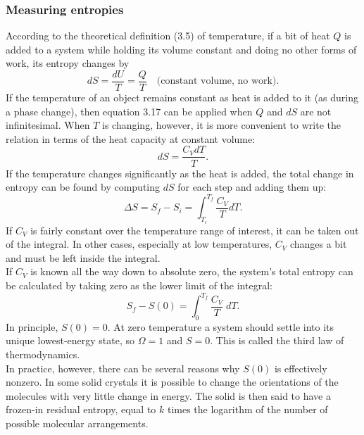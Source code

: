 \documentclass[11pt]{exam}
\begin{document}
\subsubsection*{Measuring entropies}
According to the theoretical definition (3.5) of temperature, if a bit of heat $Q$ is added to a system while holding its volume constant and doing no other forms of work, its entropy changes by
\begin{equation}\tag{3.17}
dS=\frac{dU}{T}=\frac{Q}{T}\quad\text{(constant volume, no work).}
\end{equation}
\hspace*{10mm}If the temperature of an object remains constant as heat is added to it (as during a phase change), then equation 3.17 can be applied when $Q$ and $dS$ are not infinitesimal. When $T$ is changing, however, it is more convenient to write the relation in terms of the heat capacity at constant volume:
\begin{equation}\tag{3.18}
dS=\frac{C_V dT}{T}.
\end{equation}
If the temperature changes significantly as the heat is added, the total change in entropy can be found by computing $dS$ for each step and adding them up:
\begin{equation}\tag{3.19}
\Delta S = S_f - S_i = \int_{T_i}^{T_f}\frac{C_V}{T}dT.     
\end{equation}
If $C_V$ is fairly constant over the temperature range of interest, it can be taken out of the integral. In other cases, especially at low temperatures, $C_V$ changes a bit and must be left inside the integral.\\
\hspace*{10mm}If $C_V$ is known all the way down to absolute zero, the system's total entropy can be calculated by taking zero as the lower limit of the integral:
\begin{equation}
S_f - S(0) = \int_{0}^{T_f}\frac{C_V}{T}\;dT.   
\end{equation}
In principle, $S(0)=0$. At zero temperature a system should settle into its unique lowest-energy state, so $\Omega=1$ and $S=0$. This is called the third law of thermodynamics.\\
\hspace*{10mm}In practice, however, there can be several reasons why $S(0)$ is effectively nonzero. In some solid crystals it is possible to change the orientations of the molecules with very little change in energy. The solid is then said to have a frozen-in residual entropy, equal to $k$ times the logarithm of the number of possible molecular arrangements.\\
\end{document}
